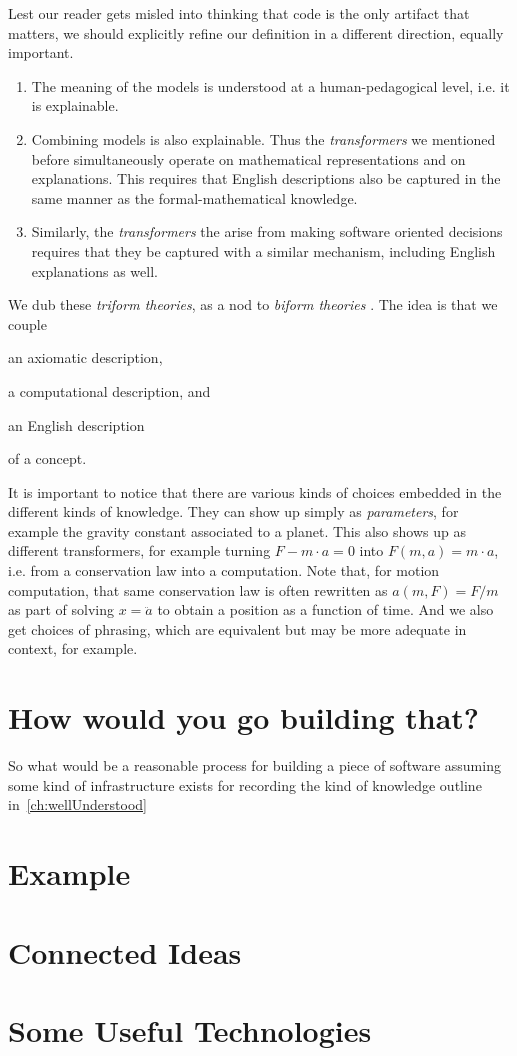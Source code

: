 \documentclass[10pt,twoside,onecolumn,openany,letterpaper]{memoir}
\begin{document}
Lest our reader gets misled into thinking that code is the only artifact
that matters, we should explicitly refine our definition in a different
direction, equally important.
\begin{enumerate}
\item The meaning of the models is understood at a human-pedagogical
level, i.e. it is explainable.
\item Combining models is also explainable. Thus the \emph{transformers}
we mentioned before simultaneously operate on mathematical representations
and on explanations. This requires that English descriptions also be
captured in the same manner as the formal-mathematical knowledge.
\item Similarly, the \emph{transformers} the arise from making software
oriented decisions requires that they be captured with a similar mechanism,
including English explanations as well.
\end{enumerate}

We dub these \emph{triform theories}, as a nod to \emph{biform theories}%
\cite{Farmer}. The idea is that we couple 
\begin{enumerate*}
\item an axiomatic description,
\item a computational description, and
\item an English description
\end{enumerate*}
of a concept.

It is important to notice that there are various kinds of choices
embedded in the different kinds of knowledge. They can show up simply as
\emph{parameters}, for example the gravity constant associated to a planet.
This also shows up as different transformers, for example turning
$F - m\cdot a = 0$ into $F\left(m, a\right) = m\cdot a$, i.e. from a 
conservation law into a computation. Note that, for motion computation, that
same conservation law is often rewritten as $a\left(m,F\right) = F/m$ as
part of solving $x = \ddot{a}$ to obtain a position as a function of time.
And we also get choices of phrasing, which are equivalent but may be more
adequate in context, for example.

\chapter{How would you go building that?}\label{ch:process}

So what would be a reasonable process for building a piece of software
assuming some kind of infrastructure exists for recording the kind of
knowledge outline in~\autoref{ch:wellUnderstood}

\chapter{Example}\label{ch:example}

\chapter{Connected Ideas}\label{ch:ideas}

\chapter{Some Useful Technologies}\label{ch:techniques}
\end{document}

